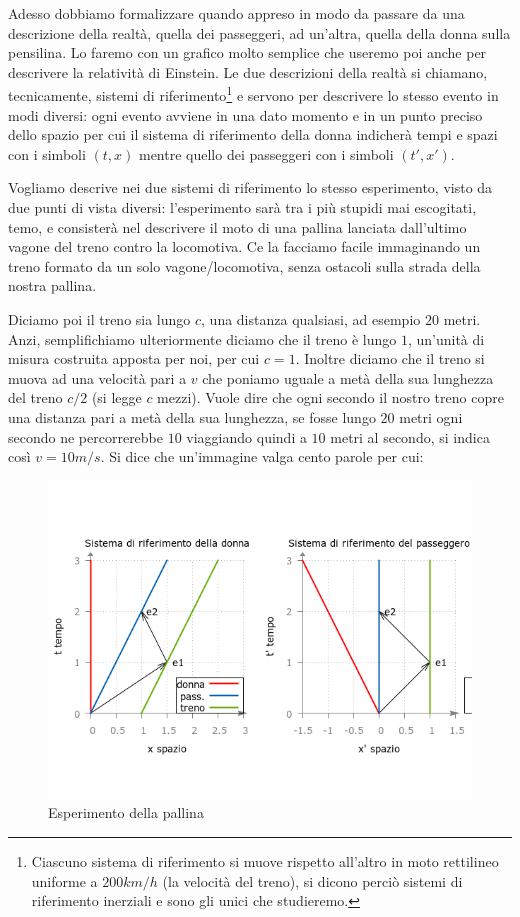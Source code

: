 Adesso dobbiamo formalizzare quando appreso in modo da passare da una descrizione della realtà, quella dei passeggeri, ad un'altra, quella della donna sulla pensilina. Lo faremo con un grafico molto semplice che useremo poi anche per descrivere la relatività di Einstein. Le due descrizioni della realtà si chiamano, tecnicamente, sistemi di riferimento\footnote{Ciascuno sistema di riferimento si muove rispetto all’altro in moto rettilineo uniforme a $200 km/h$ (la velocità del treno), si dicono perciò sistemi di riferimento inerziali e sono gli unici che studieremo.}  e servono per descrivere lo stesso evento in modi diversi: ogni evento avviene in una dato momento e in un punto preciso dello spazio per cui il sistema di riferimento della donna indicherà tempi e spazi con i simboli $(t,x)$ mentre quello dei passeggeri con i simboli $(t',x')$.

Vogliamo descrive nei due sistemi di riferimento lo stesso esperimento, visto da due punti di vista diversi: l'esperimento sarà tra i più stupidi mai escogitati, temo, e consisterà nel descrivere il moto di una pallina lanciata dall'ultimo vagone del treno contro la locomotiva. Ce la facciamo facile immaginando un treno formato da un solo vagone/locomotiva, senza ostacoli sulla strada della nostra pallina.

Diciamo poi il treno sia lungo  $c$, una distanza qualsiasi, ad esempio $20$ metri. Anzi, semplifichiamo ulteriormente diciamo che il treno è lungo $1$, un'unità di misura costruita apposta per noi, per cui $c=1$.  Inoltre diciamo che il treno si muova ad una velocità pari a $v$ che poniamo uguale a metà della sua lunghezza del treno $c/2$ (si legge $c$ mezzi).  Vuole dire che ogni secondo il nostro treno copre una distanza pari a metà della sua lunghezza, se fosse lungo $20$ metri ogni secondo ne percorrerebbe $10$ viaggiando quindi a $10$ metri al secondo, si indica così $v=10m/s$. Si dice che un'immagine valga cento parole per cui:

\begin{figure}[h!]
 \centering
 \includegraphics[scale=0.7]{figure/fig4}
 \caption{Esperimento della pallina}
\end{figure}

